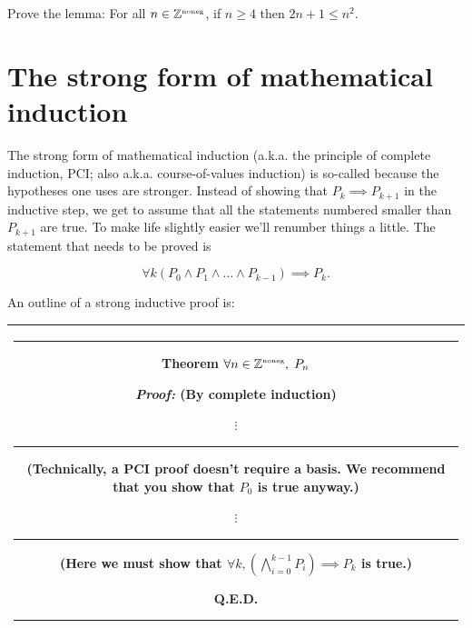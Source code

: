 \begin{exer} 
Prove the lemma:  For all $n \in {\mathbb Z}^{\mbox{\tiny noneg}}$, if $n \geq 4$ then
$2n+1 \leq n^2$.
\end{exer}

\newpage
  



\newpage
 
\section{The strong form of mathematical induction}

The strong form of mathematical induction (a.k.a. the principle of
complete induction, PCI; also a.k.a. course-of-values induction) 
is so-called because the hypotheses one
uses are stronger.  Instead of showing that $P_k \implies P_{k+1}$ in
the inductive step, we get to assume that all the statements numbered
smaller than $P_{k+1}$ are true.  To make life slightly easier we'll
renumber things a little.  The statement that needs to be proved is

\[ \forall k (P_0 \land P_1 \land \ldots \land  P_{k-1}) \implies P_k. \]

 An outline of a strong inductive proof is:

\begin{center}
\begin{tabular}{|c|} \hline
\rule{16pt}{0pt}\begin{minipage}{.75\textwidth}

\rule{0pt}{16pt}{\bf \large Theorem} $ \displaystyle \forall n \in {\mathbb Z}^{\mbox{\tiny noneg}}, \; P_n $
\medskip

\rule{0pt}{20pt} {\em Proof:} (By complete induction)

\noindent {\bf Basis:}

\begin{center}
$\vdots$ \rule{36pt}{0pt} \begin{minipage}[c]{1.7 in} (Technically, a PCI %
proof doesn't require a basis.   We recommend that you show that $P_0$ %
is true anyway.) \end{minipage}
\end{center}

\noindent {\bf Inductive step:}

\begin{center}
$\vdots$ \rule{36pt}{0pt} \begin{minipage}[c]{1.7 in} (Here we must show that $\forall k,  \left( \bigwedge_{i=0}^{k-1} P_i \right) \implies P_{k}$ is true.) \end{minipage}
\end{center}

\rule{0pt}{0pt} \hspace{\fill} Q.E.D. \rule[-10pt]{0pt}{16pt}
\end{minipage} \rule{16pt}{0pt} \\ \hline
\end{tabular}
\end{center}
\medskip

